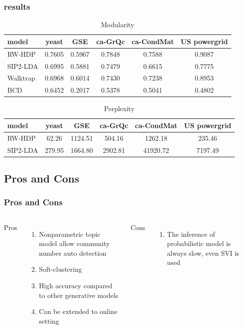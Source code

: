 \documentclass{beamer}
\begin{document}
\begin{frame}
\frametitle{results}
\begin{table}[ht]
	\caption{Modularity}
	\begin{center}
		\begin{tabular}{l|c|c|c|c|c}
			\hline
			model & yeast & GSE & ca-GrQc & ca-CondMat & US powergrid \\
			\hline
			RW-HDP & 0.7605 & 0.5967 & 0.7848 & 0.7588 & 0.9087 \\
			SIP2-LDA & 0.6995 & 0.5881 & 0.7479 & 0.6615 & 0.7775 \\
			Walktrap & 0.6968 & 0.6014 & 0.7430 & 0.7238 & 0.8953 \\
			BCD & 0.6452 & 0.2017 & 0.5378 & 0.5041 & 0.4802 \\
			\hline
		\end{tabular}
	\end{center}
	\label{table:modularity}
\end{table}

\begin{table}[ht]
	\caption{Perplexity}
	\begin{center}
		\begin{tabular}{l|c|c|c|c|c}
			\hline
			model & yeast & GSE & ca-GrQc & ca-CondMat & US powergrid \\
			\hline
			RW-HDP & 62.26 & 1124.51 & 504.16 & 1262.18 & 235.46 \\
			SIP2-LDA & 279.95 & 1664.80 & 2902.81 & 41920.72 & 7197.49 \\
			\hline
		\end{tabular}
	\end{center}
	\label{table:perplexity}
\end{table}
\end{frame}
\subsection{Pros and Cons}
\begin{frame}
\frametitle{Pros and Cons}
\begin{columns}[t] %
	
	Pros
	\begin{enumerate}
		\item Nonparametric topic model allow community number auto detection
		\item Soft-clustering 
		\item High accuracy compared to other generative models
		\item Can be extended to online setting
	\end{enumerate}
	
	Cons
	\begin{enumerate}
		\item The inference of probabilistic model is always slow, even SVI is used
	\end{enumerate}
\end{columns}
\end{frame}
\end{document}
